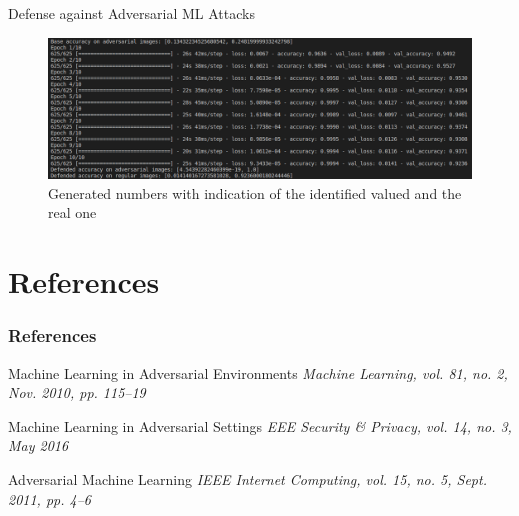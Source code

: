 \documentclass[8pt]{beamer}
\begin{document}
\begin{frame}{Defense against Adversarial ML Attacks}
\begin{figure} 
    \includegraphics[scale=0.278]{images/immagini_matrix/defense_computation.png}
    \vspace*{-2mm}
    \caption{Generated numbers with indication of the identified valued and the real one}
\end{figure}
\end{frame}

\section{References}
\begin{frame}
\frametitle{References}
\begin{thebibliography}{99}
\newblock Machine Learning in Adversarial Environments
\newblock \emph{Machine Learning, vol. 81, no. 2, Nov. 2010, pp. 115–19}
\end{thebibliography}

\begin{thebibliography}{99}
\newblock Machine Learning in Adversarial Settings
\newblock \emph{EEE Security \& Privacy, vol. 14, no. 3, May 2016}
\end{thebibliography}

\begin{thebibliography}{99}
\newblock Adversarial Machine Learning
\newblock \emph{IEEE Internet Computing, vol. 15, no. 5, Sept. 2011, pp. 4–6}
\end{thebibliography}

\end{frame}
\end{document}
